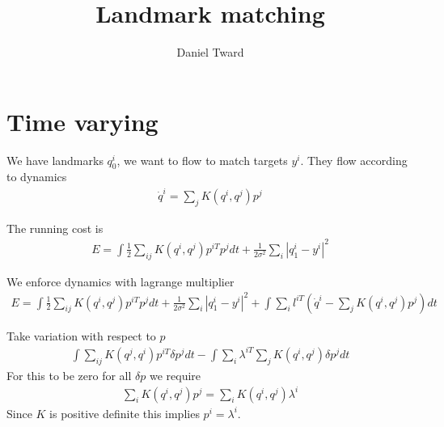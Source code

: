 \documentclass{article}
\author{Daniel Tward}
\title{Landmark matching}
\begin{document}
\maketitle 


\section{Time varying}
We have landmarks $q_0^i$, we want to flow to match targets $y^i$.  They flow according to dynamics 
\begin{align*}
\dot q^i = \sum_j K(q^i,q^j)p^j
\end{align*}

The running cost is
\begin{align*}
E = \int \frac12 \sum_{ij} K(q^i,q^j)p^{iT}p^jdt + \frac{1}{2\sigma^2}\sum_i |q_1^i - y^i|^2
\end{align*}

We enforce dynamics with lagrange multiplier
\begin{align*}
E = \int \frac12 \sum_{ij} K(q^i,q^j)p^{iT}p^jdt + \frac{1}{2\sigma^2}\sum_i |q_1^i - y^i|^2  + \int \sum_i l^{iT}(\dot q^i - \sum_j K(q^i,q^j)p^j)dt
\end{align*}

Take variation with respect to $p$
\begin{align*}
\int \sum_{ij} K(q^j,q^i)p^{iT}\delta p^j dt - \int \sum_i \lambda^{iT}\sum_j K(q^i,q^j)\delta p^j dt
\end{align*}
For this to be zero for all $\delta p$ we require
\begin{align*}
\sum_{i} K(q^i,q^j) p^j = \sum_{i}K(q^i,q^j)\lambda^i
\end{align*}
Since $K$ is positive definite this implies $p^i = \lambda^i$.
\end{document}
